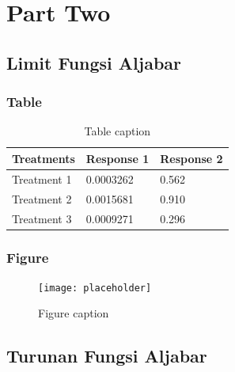 \documentclass[11pt,fleqn]{book} %
\begin{document}
\part{Part Two}



\chapter{Limit Fungsi Aljabar}

\section{Table}

\begin{table}[h]
\centering
\begin{tabular}{l l l}
\toprule
\textbf{Treatments} & \textbf{Response 1} & \textbf{Response 2}\\
\midrule
Treatment 1 & 0.0003262 & 0.562 \\
Treatment 2 & 0.0015681 & 0.910 \\
Treatment 3 & 0.0009271 & 0.296 \\
\bottomrule
\end{tabular}
\caption{Table caption}
\end{table}


\section{Figure}

\begin{figure}[h]
\centering\texttt{[image: placeholder]}
\caption{Figure caption}
\end{figure}



\chapter{Turunan Fungsi Aljabar}
\end{document}
